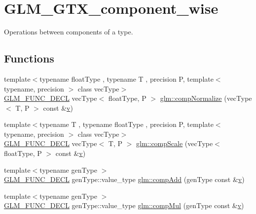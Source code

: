 \hypertarget{group__gtx__component__wise}{}\section{G\+L\+M\+\_\+\+G\+T\+X\+\_\+component\+\_\+wise}
\label{group__gtx__component__wise}


Operations between components of a type.  


\subsection*{Functions}
\begin{DoxyCompactItemize}
\item 
{\footnotesize template$<$typename float\+Type , typename T , precision P, template$<$ typename, precision $>$ class vec\+Type$>$ }\\\mbox{\hyperlink{setup_8hpp_ab2d052de21a70539923e9bcbf6e83a51}{G\+L\+M\+\_\+\+F\+U\+N\+C\+\_\+\+D\+E\+CL}} vec\+Type$<$ float\+Type, P $>$ \mbox{\hyperlink{group__gtx__component__wise_gaeb34fdf090d2d4da9babcdfec267f09e}{glm\+::comp\+Normalize}} (vec\+Type$<$ T, P $>$ const \&\mbox{\hyperlink{glad_8h_a14cfbe2fc2234f5504618905b69d1e06}{v}})
\item 
{\footnotesize template$<$typename T , typename float\+Type , precision P, template$<$ typename, precision $>$ class vec\+Type$>$ }\\\mbox{\hyperlink{setup_8hpp_ab2d052de21a70539923e9bcbf6e83a51}{G\+L\+M\+\_\+\+F\+U\+N\+C\+\_\+\+D\+E\+CL}} vec\+Type$<$ T, P $>$ \mbox{\hyperlink{group__gtx__component__wise_gaea99a3271016bfd331d9fa7587f3db37}{glm\+::comp\+Scale}} (vec\+Type$<$ float\+Type, P $>$ const \&\mbox{\hyperlink{glad_8h_a14cfbe2fc2234f5504618905b69d1e06}{v}})
\item 
{\footnotesize template$<$typename gen\+Type $>$ }\\\mbox{\hyperlink{setup_8hpp_ab2d052de21a70539923e9bcbf6e83a51}{G\+L\+M\+\_\+\+F\+U\+N\+C\+\_\+\+D\+E\+CL}} gen\+Type\+::value\+\_\+type \mbox{\hyperlink{group__gtx__component__wise_gaf71833350e15e74d31cbf8a3e7f27051}{glm\+::comp\+Add}} (gen\+Type const \&\mbox{\hyperlink{glad_8h_a14cfbe2fc2234f5504618905b69d1e06}{v}})
\item 
{\footnotesize template$<$typename gen\+Type $>$ }\\\mbox{\hyperlink{setup_8hpp_ab2d052de21a70539923e9bcbf6e83a51}{G\+L\+M\+\_\+\+F\+U\+N\+C\+\_\+\+D\+E\+CL}} gen\+Type\+::value\+\_\+type \mbox{\hyperlink{group__gtx__component__wise_gae8ab88024197202c9479d33bdc5a8a5d}{glm\+::comp\+Mul}} (gen\+Type const \&\mbox{\hyperlink{glad_8h_a14cfbe2fc2234f5504618905b69d1e06}{v}})

\end{DoxyCompactItemize}
